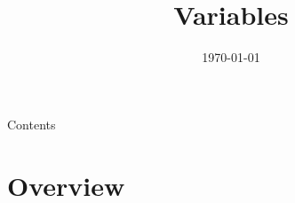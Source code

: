 
\newcommand{\topic}{
	Variables
}

\title{\topic}
\supertitle{\course}
\date{\today}



\maketitle

\begin{frame}{Contents}
	\tableofcontents
\end{frame}

\section{Overview}
